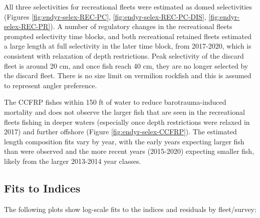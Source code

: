\documentclass[11pt,
  english,
]{article}
\begin{document}
All three selectivities for recreational fleets were estimated as domed selectivities (Figures \ref{fig:endyr-selex-REC-PC}, \ref{fig:endyr-selex-REC-PC-DIS}, \ref{fig:endyr-selex-REC-PR}). A number of regulatory changes in the recreational fleets prompted selectivity time blocks, and both recreational retained fleets estimated a large length at full selectivity in the later time block, from 2017-2020, which is consistent with relaxation of depth restrictions. Peak selectivity of the discard fleet is around 20 cm, and once fish reach 40 cm, they are no longer selected by the discard fleet. There is no size limit on vermilion rockfish and this is assumed to represent angler preference.

The CCFRP fishes within 150 ft of water to reduce barotrauma-induced mortality and does not observe the larger fish that are seen in the recreational fleets fishing in deeper waters (especially once depth restrictions were relaxed in 2017) and further offshore (Figure \ref{fig:endyr-selex-CCFRP}). The estimated length composition fits vary by year, with the early years expecting larger fish than were observed and the more recent years (2015-2020) expecting smaller fish, likely from the larger 2013-2014 year classes.


\hypertarget{fits-to-indices}{%
\subsection{Fits to Indices}\label{fits-to-indices}}

\leavevmode\tagmcend\tagstructend

The following plots show log-scale fits to the indices and residuals by fleet/survey:

\end{document}
